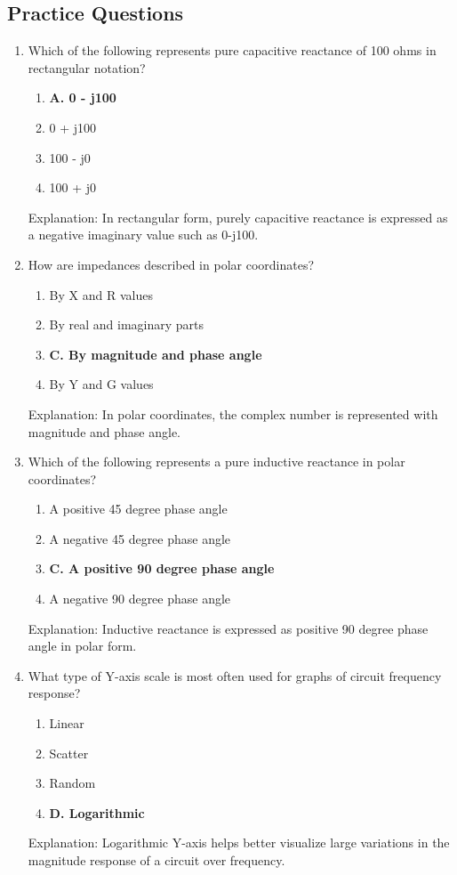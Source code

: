 \subsection*{Practice Questions}
\begin{enumerate}
    \item Which of the following represents pure capacitive reactance of 100 ohms in rectangular notation?
    \begin{enumerate}
     \item \textbf{A. 0 - j100}
       \item  0 + j100
        \item  100 - j0
      \item  100 + j0
    \end{enumerate}
     \textcolor{myred}{Explanation:}
    In rectangular form, purely capacitive reactance is expressed as a negative imaginary value such as  0-j100.

      \item How are impedances described in polar coordinates?
       \begin{enumerate}
    \item  By X and R values
         \item  By real and imaginary parts
      \item \textbf{C. By magnitude and phase angle}
       \item  By Y and G values
    \end{enumerate}
    \textcolor{myred}{Explanation:}
      In polar coordinates, the complex number is represented with magnitude and phase angle.
       
  \item Which of the following represents a pure inductive reactance in polar coordinates?
    \begin{enumerate}
    \item  A positive 45 degree phase angle
        \item  A negative 45 degree phase angle
        \item \textbf{C. A positive 90 degree phase angle}
        \item  A negative 90 degree phase angle
     \end{enumerate}
     \textcolor{myred}{Explanation:}
      Inductive reactance is expressed as positive 90 degree phase angle in polar form.

    \item What type of Y-axis scale is most often used for graphs of circuit frequency response?
    \begin{enumerate}
    \item  Linear
        \item  Scatter
     \item  Random
      \item \textbf{D. Logarithmic}
    \end{enumerate}
       \textcolor{myred}{Explanation:}
       Logarithmic Y-axis helps better visualize large variations in the magnitude response of a circuit over frequency.
        

\end{enumerate}
